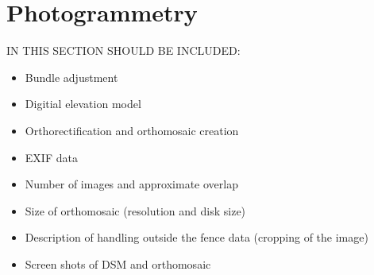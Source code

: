 \documentclass[../Head/Main.tex]{subfiles}
\begin{document}
\section{Photogrammetry}
IN THIS SECTION SHOULD BE INCLUDED:
\begin{itemize}
\item Bundle adjustment
\item Digitial elevation model
\item Orthorectification and orthomosaic creation
\item EXIF data
\item Number of images and approximate overlap
\item Size of orthomosaic (resolution and disk size)
\item Description of handling outside the fence data (cropping of the image)
\item Screen shots of DSM and orthomosaic
\end{itemize}
\end{document}
